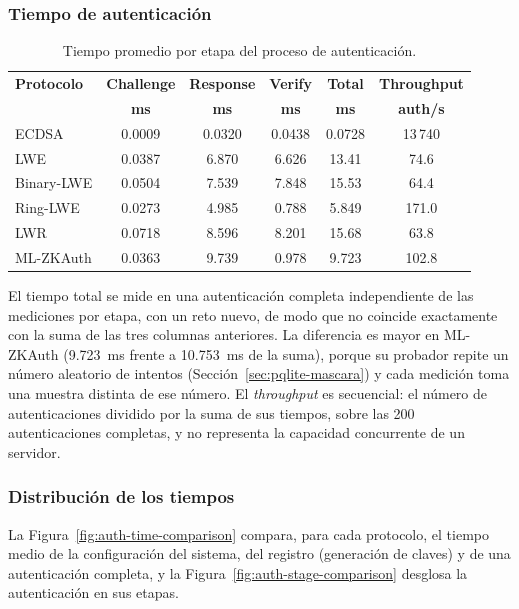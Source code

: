 \subsubsection{Tiempo de autenticación}

\begin{table}[H]
\centering
\caption{Tiempo promedio por etapa del proceso de autenticación.}
\label{tab:authentication-time}
\small
\begin{tabularx}{\textwidth}{lCCCCC}
\toprule
\textbf{Protocolo} &
\textbf{Challenge} &
\textbf{Response} &
\textbf{Verify} &
\textbf{Total} &
\textbf{Throughput} \\
&
\textbf{ms} &
\textbf{ms} &
\textbf{ms} &
\textbf{ms} &
\textbf{auth/s} \\
\midrule

ECDSA      & 0.0009 & 0.0320 & 0.0438 & 0.0728 & 13\,740 \\
LWE        & 0.0387 & 6.870 & 6.626 & 13.41 & 74.6 \\
Binary-LWE & 0.0504 & 7.539 & 7.848 & 15.53 & 64.4 \\
Ring-LWE   & 0.0273 & 4.985 & 0.788 & 5.849 & 171.0 \\
LWR        & 0.0718 & 8.596 & 8.201 & 15.68 & 63.8 \\
ML-ZKAuth  & 0.0363 & 9.739 & 0.978 & 9.723 & 102.8 \\

\bottomrule
\end{tabularx}
\end{table}

El tiempo total se mide en una autenticación completa independiente de las mediciones por etapa, con un reto nuevo, de modo que no coincide exactamente con la suma de las tres columnas anteriores. La diferencia es mayor en ML-ZKAuth (9.723~ms frente a 10.753~ms de la suma), porque su probador repite un número aleatorio de intentos (Sección~\ref{sec:pqlite-mascara}) y cada medición toma una muestra distinta de ese número. El \textit{throughput} es secuencial: el número de autenticaciones dividido por la suma de sus tiempos, sobre las 200 autenticaciones completas, y no representa la capacidad concurrente de un servidor.


\subsubsection{Distribución de los tiempos}

La Figura~\ref{fig:auth-time-comparison} compara, para cada protocolo, el tiempo medio de la
configuración del sistema, del registro (generación de claves) y de una autenticación
completa, y la Figura~\ref{fig:auth-stage-comparison} desglosa la autenticación en sus
etapas.

